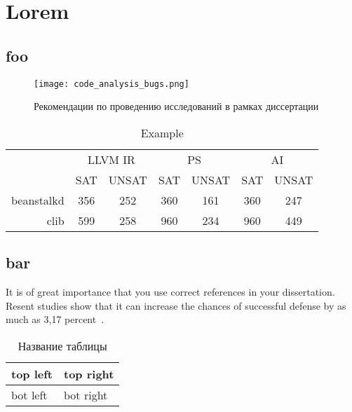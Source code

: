 \chapter{Lorem}

\section{foo}

\blindtext

\begin{figure}[htbp]
\centering
\texttt{[image: code\_analysis\_bugs.png]}
\caption{Рекомендации по проведению исследований в рамках диссертации}%
\label{fig:how-to-do-research}
\end{figure}

\Blindtext

\begin{table}
\captionsetup{skip=5pt}
\caption{Example}
\centering
\begin{tabular}{|r|c|c|c|c|c|c|}
\hline
            \multirow{2}{*}{}
           & \multicolumn{2}{c|}{LLVM IR} 
           & \multicolumn{2}{c|}{PS} 
           & \multicolumn{2}{c|}{AI} \\ \cline{2-7}
           & SAT    & UNSAT   & SAT    & UNSAT   & SAT    & UNSAT   \\ \hline
beanstalkd & 356    & 252     & 360    & 161     & 360    & 247     \\ \hline
clib       & 599    & 258     & 960    & 234     & 960    & 449     \\ \hline
\end{tabular}
\label{table:checkResults}
\end{table}

\section{bar}

\blindtext
It is of great importance that you use correct references in your dissertation.
Resent studies show that it can increase the chances of successful defense
by as much as 3,17 percent~\cite{one}.

\begin{table}[H]
	\caption{Название таблицы}
	\begin{center}
		\begin{tabular}{|l|l|}
			\hline
			top left & top right\\ \hline
			bot left & bot right\\ \hline
		\end{tabular}
		\label{tabular:tab_examp}
	\end{center}
\end{table}


\Blindtext
